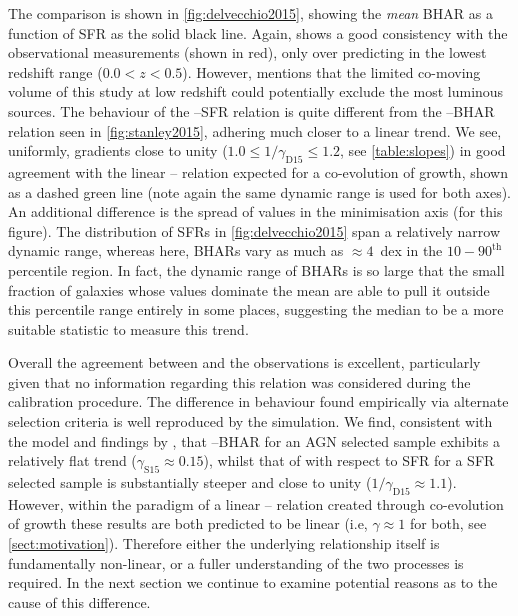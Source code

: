 The comparison is shown in \cref{fig:delvecchio2015}, showing the \textit{mean}
BHAR as a function of SFR as the solid black line.  Again, \eagle shows a good
consistency with the observational measurements (shown in red), only over
predicting  in the lowest redshift range ($0.0 < z < 0.5$).  However,
\citet{Delvecchio2015} mentions that the limited co-moving volume of this study
at low redshift could potentially exclude the most luminous sources.  The
behaviour of the --SFR relation is quite different from the
--BHAR relation seen in \cref{fig:stanley2015}, adhering much closer to
a linear trend. We see, uniformly, gradients close to unity ($1.0 \leq 1 /
\gamma_{\mathrm{D15}} \leq 1.2$, see \cref{table:slopes}) in good agreement
with the linear -- relation expected for a co-evolution of
growth, shown as a dashed green line (note again the same dynamic range is used
for both axes).  An additional difference is the spread of values in the
minimisation axis (\BHAR for this figure). The distribution of SFRs in
\cref{fig:delvecchio2015} span a relatively narrow dynamic range, whereas here,
BHARs vary as much as $\approx 4$~dex in the $10-90^{\mathrm{th}}$ percentile
region.  In fact, the dynamic range of BHARs is so large that the small
fraction of galaxies whose values dominate the mean are able to pull it outside
this percentile range entirely in some places, suggesting the median to be a
more suitable statistic to measure this trend. 

Overall the agreement between \eagle and the observations is excellent,
particularly given that no information regarding this relation was considered
during the calibration procedure. The difference in behaviour found empirically
via alternate selection criteria is well reproduced by the simulation. We find,
consistent with the \citet{Hickox2014} model and findings by
\citet{Volonteri2015b}, that --BHAR for an AGN selected sample exhibits
a relatively flat trend ($\gamma_{\mathrm{S15}} \approx 0.15$), whilst that of
 with respect to SFR for a SFR selected sample is substantially
steeper and close to unity ($1 / \gamma_{\mathrm{D15}} \approx 1.1$). However,
within the paradigm of a linear -- relation created through
co-evolution of growth these results are both predicted to be linear (i.e,
$\gamma \approx 1$ for both, see \cref{sect:motivation}).  Therefore either the
underlying relationship itself is fundamentally non-linear, or a fuller
understanding of the two processes is required. In the next section we continue
to examine potential reasons as to the cause of this difference. 

